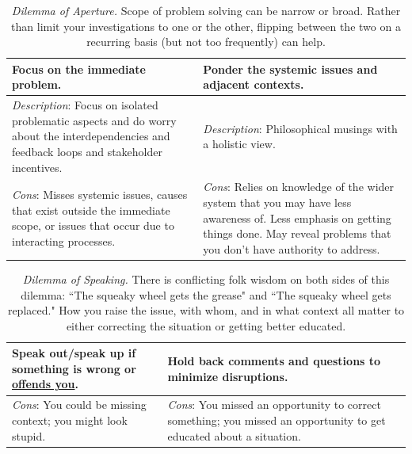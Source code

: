 \begin{center}
\begin{table}[H] %
\begin{tabular}{ | m{\dilemmatablewidth}| m{\dilemmatablewidth} | } 
  \hline
  \textbf{Focus on the immediate problem.} &
  \textbf{Ponder the systemic issues and adjacent contexts.} \\
  \hline
  \textit{Description}: Focus on isolated problematic aspects and do worry about the interdependencies and feedback loops and stakeholder incentives. &
  \textit{Description}: Philosophical musings with a holistic view. \\
  \hline
  \textit{Cons}: Misses systemic issues, causes that exist outside the immediate scope, or issues that occur due to interacting processes. & 
  \textit{Cons}: Relies on knowledge of the wider system that you may have less awareness of. Less emphasis on getting things done. May reveal problems that you don't have authority to address. \\
  \hline
\end{tabular}
\caption{
\textit{Dilemma of Aperture.}
Scope of problem solving can be narrow or broad. Rather than limit your investigations to one or the other, flipping between the two on a recurring basis (but not too frequently) can help.
}
\label{table:focus-vs-systemic}
\end{table}
\end{center}


\begin{center}
\begin{table}[H] %
\begin{tabular}{ | m{\dilemmatablewidth}| m{\dilemmatablewidth} | } 
  \hline
  \textbf{Speak out/speak up if something is wrong or \href{https://en.wikipedia.org/wiki/Moral_injury}{offends you}.} &
  \textbf{Hold back comments and questions to minimize disruptions.} \\
  \hline
  \textit{Cons}: You could be missing context; you might look stupid. & 
  \textit{Cons}: You missed an opportunity to correct something; you missed an opportunity to get educated about a situation. \\
  \hline
\end{tabular}
\caption{
\textit{Dilemma of Speaking.}
There is conflicting folk wisdom on both sides of this dilemma: 
``The squeaky wheel gets the grease" 
and 
``The squeaky wheel gets replaced." 
How you raise the issue, with whom, and in what context all matter to either correcting the situation or getting better educated.
}
\label{table:speak-up-or-hold-back}
\end{table}
\end{center}

